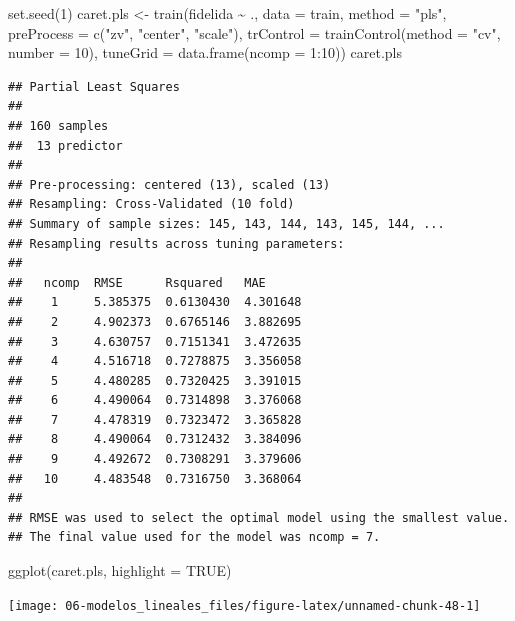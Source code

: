 \documentclass[
]{book}
\newenvironment{Shaded}{\begin{snugshade}}{\end{snugshade}}
\newcommand{\AttributeTok}[1]{\textcolor[rgb]{0.77,0.63,0.00}{#1}}
\newcommand{\ConstantTok}[1]{\textcolor[rgb]{0.00,0.00,0.00}{#1}}
\newcommand{\DecValTok}[1]{\textcolor[rgb]{0.00,0.00,0.81}{#1}}
\newcommand{\FunctionTok}[1]{\textcolor[rgb]{0.00,0.00,0.00}{#1}}
\newcommand{\NormalTok}[1]{#1}
\newcommand{\OtherTok}[1]{\textcolor[rgb]{0.56,0.35,0.01}{#1}}
\newcommand{\SpecialCharTok}[1]{\textcolor[rgb]{0.00,0.00,0.00}{#1}}
\newcommand{\StringTok}[1]{\textcolor[rgb]{0.31,0.60,0.02}{#1}}
\theoremstyle{break}
\theoremstyle{definition}
\theoremstyle{definition}
\theoremstyle{definition}
\theoremstyle{definition}
\theoremstyle{remark}
\begin{document}
\begin{Shaded}
\begin{Highlighting}[]
\FunctionTok{set.seed}\NormalTok{(}\DecValTok{1}\NormalTok{)}
\NormalTok{caret.pls }\OtherTok{\textless{}{-}} \FunctionTok{train}\NormalTok{(fidelida }\SpecialCharTok{\textasciitilde{}}\NormalTok{ ., }\AttributeTok{data =}\NormalTok{ train, }\AttributeTok{method =} \StringTok{"pls"}\NormalTok{,}
                   \AttributeTok{preProcess =} \FunctionTok{c}\NormalTok{(}\StringTok{"zv"}\NormalTok{, }\StringTok{"center"}\NormalTok{, }\StringTok{"scale"}\NormalTok{),}
                   \AttributeTok{trControl =} \FunctionTok{trainControl}\NormalTok{(}\AttributeTok{method =} \StringTok{"cv"}\NormalTok{, }\AttributeTok{number =} \DecValTok{10}\NormalTok{),}
                   \AttributeTok{tuneGrid =} \FunctionTok{data.frame}\NormalTok{(}\AttributeTok{ncomp =} \DecValTok{1}\SpecialCharTok{:}\DecValTok{10}\NormalTok{))}
\NormalTok{caret.pls}
\end{Highlighting}
\end{Shaded}

\begin{verbatim}
## Partial Least Squares 
## 
## 160 samples
##  13 predictor
## 
## Pre-processing: centered (13), scaled (13) 
## Resampling: Cross-Validated (10 fold) 
## Summary of sample sizes: 145, 143, 144, 143, 145, 144, ... 
## Resampling results across tuning parameters:
## 
##   ncomp  RMSE      Rsquared   MAE     
##    1     5.385375  0.6130430  4.301648
##    2     4.902373  0.6765146  3.882695
##    3     4.630757  0.7151341  3.472635
##    4     4.516718  0.7278875  3.356058
##    5     4.480285  0.7320425  3.391015
##    6     4.490064  0.7314898  3.376068
##    7     4.478319  0.7323472  3.365828
##    8     4.490064  0.7312432  3.384096
##    9     4.492672  0.7308291  3.379606
##   10     4.483548  0.7316750  3.368064
## 
## RMSE was used to select the optimal model using the smallest value.
## The final value used for the model was ncomp = 7.
\end{verbatim}

\begin{Shaded}
\begin{Highlighting}[]
\FunctionTok{ggplot}\NormalTok{(caret.pls, }\AttributeTok{highlight =} \ConstantTok{TRUE}\NormalTok{)}
\end{Highlighting}
\end{Shaded}

\begin{center}\texttt{[image: 06-modelos\_lineales\_files/figure-latex/unnamed-chunk-48-1]} \end{center}
\end{document}
